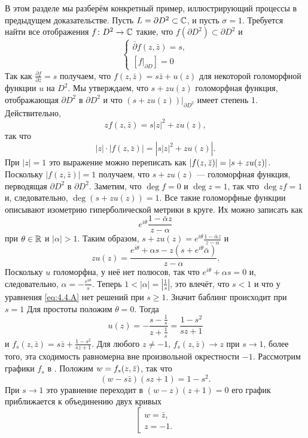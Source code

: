 В этом разделе мы разберём конкретный пример, иллюстрирующий процессы в предыдущем доказательстве.
Пусть $L = \partial D^2 \subset \mathbb{C}$, и пусть $\sigma = 1$.
Требуется найти все отображения $f\colon D^2 \to \mathbb{C}$ такие, что $f
(\partial D^2) \subset \partial D^2$ и 
\begin{equation}
\begin{cases}
\bar\partial f(z,\bar z)=s,
\\
[f|_{\partial D}]=0
\end{cases}
\label{eq:4.4.A}
\end{equation}
Так как $\tfrac{\partial f}{\partial \bar z} = s$ получаем, что $f (z,
\bar z) = s\bar z + u (z)$ для некоторой голоморфной функции $u$ на
$D^2$. 
Мы утверждаем, что $s+ zu (z)$ голоморфная функция, отображающая
$\partial D^2$ в $\partial D^2$ и что $(s+ zu (z))|_{\partial D^2}$
имеет степень 1. 
Действительно, 
\[zf (z,\bar z) = s | z |^2 + zu (z),\]
так что
\[|z|{\cdot}| f (z, \bar z) | = \left| s \left| z \right|^{2} + zu (z)\right|.\]
При $|z|=1$ это выражение можно переписать как
$|f(z,\bar z)|=|s\z+zu(z)|$.
Поскольку $|f(z,\bar z)|=1$ получаем, что $s+zu(z)$ --- голоморфная функция, перводящая $\partial D^2$ в $\partial D^2$.
Заметим, что $\deg f = 0$ и $\deg z = 1$, так что $\deg zf= 1 $ и, следовательно, $\deg (s + zu (z)) = 1$.
Все такие голоморфные функции описывают изометрию гиперболической метрики в круге.
Их можно записать как
\[e^{i\theta}\frac{1 - \bar\alpha z}{z-\alpha}\]
при $\theta \in \mathbb{R}$ и $| \alpha | > 1$.
Таким образом, $s + zu (z) = e^{i\theta}\frac{1 - \bar\alpha z}{z-\alpha}$ и 
\[zu (z)
=
\frac{e^{i\theta} + \alpha s - z (s + e^{i\theta} \bar\alpha)}{z-\alpha}.\]
Поскольку $u$ голоморфна, у неё нет полюсов, так что $e^{i\theta} + \alpha s = 0$ и, следовательно, $\alpha =-\frac{e^{i\theta}}{s}$.
Теперь $1 <| \alpha | = | \tfrac1s |$, это влечёт, что $s<1$ и что у уравнения \ref{eq:4.4.A} нет решений при $s \ge 1$.
Значит баблинг происходит при $s = 1$
Для простоты положим $\theta = 0$.
Тогда 
\[u(z)
=
-\frac{s-\frac1s}{z+\frac1s}
=
\frac{1-s^2}{sz+1}\]
и $f_s(z,\bar z)=s\bar z+\frac{1-s^2}{sz+1}$.
Для любого $z \ne -1$, $f_s (z, \bar z) \to z$ при $s\to1$, 
более того, эта сходимость равномерна вне произвольной окрестности $-1$.
Рассмотрим графики $f_s$ в .
Положим $w \z= f_s (z, \bar z)$, так что 
\[(w - s\bar z) (sz + 1) = 1 - s^2.\]
При $s \to 1$ это уравнение переходит в $(w - z) (z + 1) = 0$ его график приближается к объединению двух кривых 
\[
\left[
\begin{matrix}
w=\bar z,
\\
z=-1.
\end{matrix}
\right.
\]

